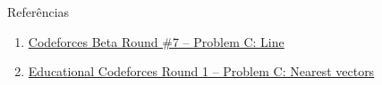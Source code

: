 \begin{frame}[fragile]{Referências}

    \begin{enumerate}
        \item \href{https://codeforces.com/problemset/problem/7/C}{Codeforces Beta Round \#7 -- Problem C: Line}

        \item \href{https://codeforces.com/problemset/problem/598/C}{Educational Codeforces Round 1 -- Problem C: Nearest vectors}

    \end{enumerate}

\end{frame}
